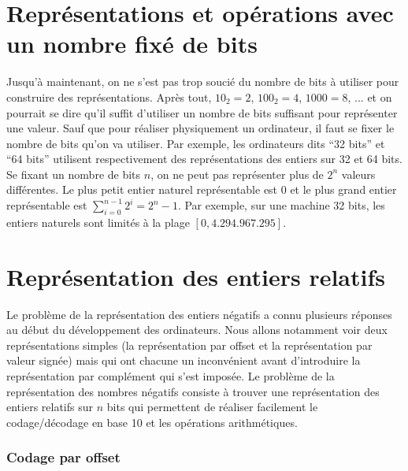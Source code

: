 \section{Représentations et opérations avec un nombre fixé de bits}

Jusqu'à maintenant, on ne s'est pas trop soucié du nombre de bits à utiliser pour construire des représentations. Après tout, $10_2 = 2$, $100_2=4$, $1000=8$, ... et on pourrait se dire qu'il suffit d'utiliser un nombre de bits suffisant pour représenter une valeur. Sauf que pour réaliser physiquement un ordinateur, il faut se fixer le nombre de bits qu'on va utiliser. Par exemple, les ordinateurs dits ``32 bits'' et ``64 bits'' utilisent respectivement des représentations des entiers sur 32 et 64 bits. Se fixant un nombre de bits $n$, on ne peut pas représenter plus de $2^n$ valeurs différentes. Le plus petit entier naturel représentable est $0$ et le plus grand entier représentable est $\sum_{i=0}^{n-1} 2^i = 2^n - 1$. Par exemple, sur une machine 32 bits, les entiers naturels sont limités à la plage $[0, 4.294.967.295]$.

\section{Représentation des entiers relatifs}

Le problème de la représentation des entiers négatifs a connu plusieurs réponses au début du développement des ordinateurs. Nous allons notamment voir deux représentations simples (la représentation par offset et la représentation par valeur signée) mais qui ont chacune un inconvénient avant d'introduire la représentation par complément qui s'est imposée. Le problème de la représentation des nombres négatifs consiste à trouver une représentation des entiers relatifs sur $n$ bits qui permettent de réaliser facilement le codage/décodage en base 10 et les opérations arithmétiques.

\subsubsection{Codage par offset}

